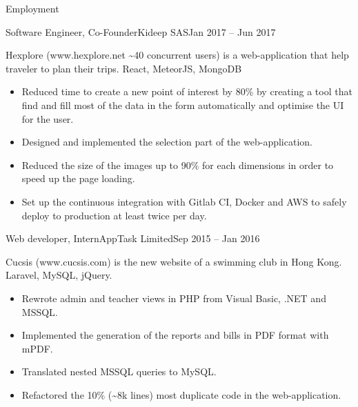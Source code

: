 \documentclass[]{mcdowellcv}
\begin{document}
	\makeheader
	
	\begin{cvsection}{Employment}
		\begin{cvsubsection}{Software Engineer, Co-Founder}{Kideep SAS}{Jan 2017 -- Jun 2017}
\raggedright Hexplore (www.hexplore.net \sim 40 concurrent users) is a web-application that help traveler to plan their trips. React, MeteorJS, MongoDB
			\begin{itemize}
				\item Reduced time to create a new point of interest by 80\% by creating a tool that find and fill most of the data in the form automatically and optimise the UI for the user.
				\item Designed and implemented the selection part of the web-application.
				\item Reduced the size of the images up to 90\% for each dimensions in order to speed up the page loading.
				\item Set up the continuous integration with Gitlab CI, Docker and AWS to safely deploy to production at least twice per day.
			\end{itemize}
		\end{cvsubsection}
		
		\begin{cvsubsection}{Web developer, Intern}{AppTask Limited}{Sep 2015 -- Jan 2016}	
\raggedright Cucsis (www.cucsis.com) is the new website of a swimming club in Hong Kong. \linebreak Laravel, MySQL, jQuery.		
			\begin{itemize}
				\item Rewrote admin and teacher views in PHP from Visual Basic, .NET and MSSQL.
				\item Implemented the generation of the reports and bills in PDF format with mPDF.
				\item Translated nested MSSQL queries to MySQL.
				\item Refactored the 10\% (\sim 8k lines) most duplicate code in the web-application.
			\end{itemize}
		\end{cvsubsection}
	\end{cvsection}
	
\end{document}
